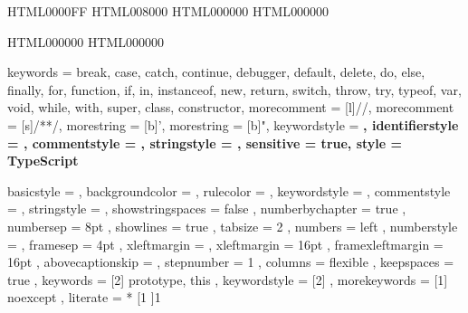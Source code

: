 
\usepackage{listings} 
\usepackage{accsupp}



\newcommand{\noncopynumber}[1]{%
    \BeginAccSupp{method=escape,ActualText={}}%
    #1%
    \EndAccSupp{}%
}

\makeatletter
\def\lst@outputspace{{\ifx\lst@bkgcolor\empty\color{white}\else\lst@bkgcolor\fi\lst@visiblespace}}
\makeatother


\definecolor{msvc_keyword}   {HTML}{0000FF} 
\definecolor{msvc_comment}   {HTML}{008000} 
\definecolor{msvc_frame}     {HTML}{000000}
\definecolor{msvc_string}    {HTML}{000000}

\definecolor{msvc_operators} {HTML}{000000}
\definecolor{msvc_stl}       {HTML}{000000}


{
    keywords        = {break, case, catch, continue, debugger, default, delete, do, else, finally, for, function, if, in, instanceof, new, return, switch, throw, try, typeof, var, void, while, with, super, class, constructor},
    morecomment     = [l]{//},
    morecomment     = [s]{/*}{*/},
    morestring      = [b]',
    morestring      = [b]", 
    keywordstyle    = \color{blue}\bfseries,
    identifierstyle = \color{black},
    commentstyle    = \color{teal}\ttfamily,
    stringstyle     = \color{red}\ttfamily,
    sensitive       = true,
    style           = TypeScript
}


{
    basicstyle       = 
\linespread{1.0}\ttfamily
\lst@ifdisplaystyle\scriptsize\fi %
%
,   backgroundcolor  = \color{msvc_background}
,   rulecolor        = \color{msvc_frame}
,   keywordstyle     = \lst@ifdisplaystyle\color{msvc_keyword}\fi
,   commentstyle     = \lst@ifdisplaystyle\color{msvc_comment}\fi
,   stringstyle      = \lst@ifdisplaystyle\color{msvc_string}\fi
,   showstringspaces = false
,   numberbychapter  = true
,   numbersep        =  8pt
,   showlines        = true
,   tabsize          =  2          
,   numbers          = left
,   numberstyle      = \tiny\color{msvc_linenumber}\noncopynumber
,   framesep         =  4pt
,   xleftmargin      = \parindent
,   xleftmargin      = 16pt
,   framexleftmargin = 16pt
,   abovecaptionskip = \medskipamount
,   stepnumber       = 1
,   columns          = flexible
,   keepspaces       = true
,	keywords         = [2]{ prototype, this }
,	keywordstyle     = [2]\lst@ifdisplaystyle\color{msvc_stl}\fi
,   morekeywords     = [1]{ noexcept }
,	literate         = *
{[}{{\lst@ifdisplaystyle\color{msvc_operators}\fi{[}}}{1}
{]}{{\lst@ifdisplaystyle\color{msvc_operators}\fi{]}}}{1}
}
